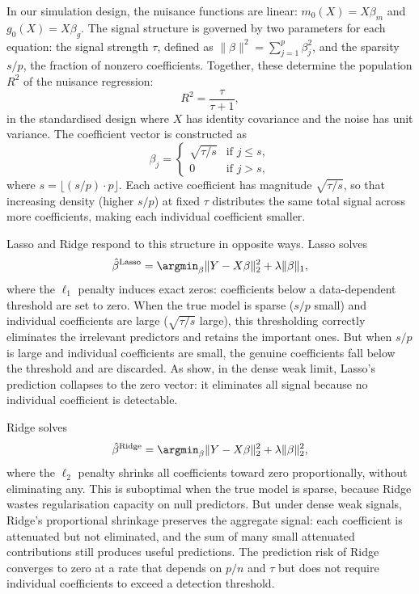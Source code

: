 \documentclass[a4paper,10.5pt]{article}
\begin{document}
In our simulation design, the nuisance functions are linear: $m_0(X) = X\beta_m$ and $g_0(X) = X\beta_g$. The signal structure is governed by two parameters for each equation: the signal strength $\tau$, defined as $\|\beta\|^2 = \sum_{j=1}^p \beta_j^2$, and the sparsity $s/p$, the fraction of nonzero coefficients. Together, these determine the population $R^2$ of the nuisance regression:
\begin{equation}
    R^2 = \frac{\tau}{\tau + 1},
\end{equation}
in the standardised design where $X$ has identity covariance and the noise has unit variance. The coefficient vector is constructed as
\begin{equation}\label{eq:beta_construction}
    \beta_j = \begin{cases} \sqrt{\tau/s} & \text{if } j \leq s, \\ 0 & \text{if } j > s, \end{cases}
\end{equation}
where $s = \lfloor (s/p) \cdot p \rfloor$. Each active coefficient has magnitude $\sqrt{\tau/s}$, so that increasing density (higher $s/p$) at fixed $\tau$ distributes the same total signal across more coefficients, making each individual coefficient smaller.

Lasso and Ridge respond to this structure in opposite ways. Lasso \citep{tibshirani1996} solves
\begin{equation}
    \hat{\beta}^{\text{Lasso}} = \argmin_\beta \|Y - X\beta\|^2_2 + \lambda \|\beta\|_1,
\end{equation}
where the $\ell_1$ penalty induces exact zeros: coefficients below a data-dependent threshold are set to zero. When the true model is sparse ($s/p$ small) and individual coefficients are large ($\sqrt{\tau/s}$ large), this thresholding correctly eliminates the irrelevant predictors and retains the important ones. But when $s/p$ is large and individual coefficients are small, the genuine coefficients fall below the threshold and are discarded. As \citet{shenxiu2025} show, in the dense weak limit, Lasso's prediction collapses to the zero vector: it eliminates all signal because no individual coefficient is detectable.

Ridge \citep{hoerl1970} solves
\begin{equation}
    \hat{\beta}^{\text{Ridge}} = \argmin_\beta \|Y - X\beta\|^2_2 + \lambda \|\beta\|^2_2,
\end{equation}
where the $\ell_2$ penalty shrinks all coefficients toward zero proportionally, without eliminating any. This is suboptimal when the true model is sparse, because Ridge wastes regularisation capacity on null predictors. But under dense weak signals, Ridge's proportional shrinkage preserves the aggregate signal: each coefficient is attenuated but not eliminated, and the sum of many small attenuated contributions still produces useful predictions. The prediction risk of Ridge converges to zero at a rate that depends on $p/n$ and $\tau$ but does not require individual coefficients to exceed a detection threshold.
\end{document}
